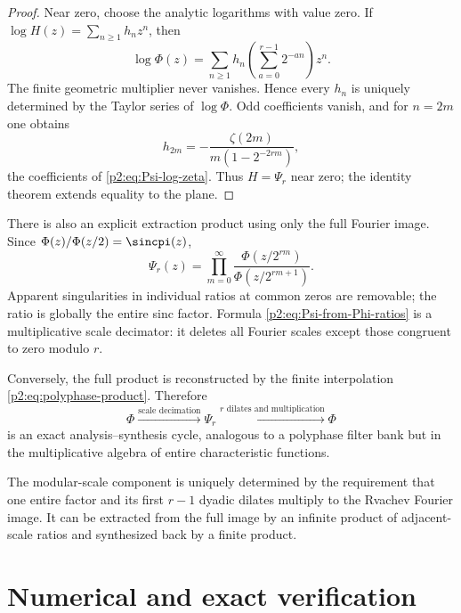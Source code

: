 \documentclass[11pt,oneside]{article}
\theoremstyle{definition}
\begin{document}
\begin{proof}
Near zero, choose the analytic logarithms with value zero.  If
$\log H(z)=\sum_{n\ge1}h_nz^n$, then
\[
 \log\Phi(z)=\sum_{n\ge1}h_n
 \left(\sum_{a=0}^{r-1}2^{-an}\right)z^n.
\]
The finite geometric multiplier never vanishes.  Hence every $h_n$ is uniquely
determined by the Taylor series of $\log\Phi$.  Odd coefficients vanish, and
for $n=2m$ one obtains
\[
 h_{2m}=-\frac{\zeta(2m)}{m(1-2^{-2rm})},
\]
the coefficients of \eqref{p2:eq:Psi-log-zeta}.  Thus $H=\Psi_r$ near zero;
the identity theorem extends equality to the plane.
\end{proof}

There is also an explicit extraction product using only the full Fourier image.
Since $\Phi(z)/\Phi(z/2)=\sincpi(z)$,
\begin{equation}
 \boxed{\displaystyle
 \Psi_r(z)=\prod_{m=0}^{\infty}
 \frac{\Phi(z/2^{rm})}{\Phi(z/2^{rm+1})}.}                \label{p2:eq:Psi-from-Phi-ratios}
\end{equation}
Apparent singularities in individual ratios at common zeros are removable;
the ratio is globally the entire sinc factor.  Formula
\eqref{p2:eq:Psi-from-Phi-ratios} is a multiplicative scale decimator: it deletes
all Fourier scales except those congruent to zero modulo $r$.

Conversely, the full product is reconstructed by the finite interpolation
\eqref{p2:eq:polyphase-product}.  Therefore
\begin{equation}
 \Phi
 \xrightarrow{\text{scale decimation}}\Psi_r
 \xrightarrow{\text{$r$ dilates and multiplication}}\Phi                 \label{p2:eq:analysis-synthesis-cycle}
\end{equation}
is an exact analysis--synthesis cycle, analogous to a polyphase filter bank but
in the multiplicative algebra of entire characteristic functions.

\begin{resultbox}
The modular-scale component is uniquely determined by the requirement that one
entire factor and its first $r-1$ dyadic dilates multiply to the Rvachev
Fourier image.  It can be extracted from the full image by an infinite product
of adjacent-scale ratios and synthesized back by a finite product.
\end{resultbox}

\section{Numerical and exact verification}
\label{p2:sec:numerics}
\end{document}
